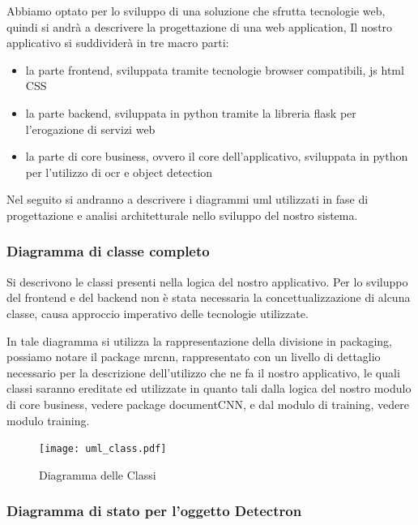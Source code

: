 \documentclass[12pt,a4paper]{article}
\begin{document}
Abbiamo optato per lo sviluppo di una soluzione che sfrutta tecnologie
web, quindi si andrà a descrivere la progettazione di una web application, Il nostro
applicativo si suddividerà in tre macro parti:

\begin{itemize}
    \item la parte frontend, sviluppata tramite tecnologie browser
        compatibili, js html CSS
    \item la parte backend, sviluppata in python tramite la libreria
        flask per l'erogazione di servizi web
    \item la parte di core business, ovvero il core dell'applicativo,
        sviluppata in python per l'utilizzo di ocr e object
        detection
\end{itemize}

Nel seguito si andranno a descrivere i diagrammi uml utilizzati in fase
di progettazione e analisi architetturale nello sviluppo del nostro
sistema.


\subsubsection{Diagramma di classe completo}

Si descrivono le classi presenti nella logica del nostro applicativo.
Per lo sviluppo del frontend e del backend non è stata necessaria la
concettualizzazione di alcuna classe, causa approccio imperativo delle
tecnologie utilizzate.

In tale diagramma si utilizza la rappresentazione della divisione in
packaging, possiamo notare il package mrcnn, rappresentato con un livello di dettaglio
necessario per la descrizione dell'utilizzo che ne fa il nostro
applicativo, le quali classi saranno ereditate ed utilizzate in quanto
tali dalla logica del nostro modulo di core business, vedere package
documentCNN, e dal modulo di training, vedere modulo training.

\begin{figure}[H]
    \caption{Diagramma delle Classi}
    \centering
    \texttt{[image: uml\_class.pdf]}
\end{figure}


\subsubsection{Diagramma di stato per l'oggetto Detectron}
\end{document}

